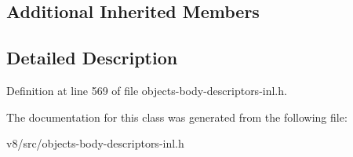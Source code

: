 \subsection*{Additional Inherited Members}


\subsection{Detailed Description}


Definition at line 569 of file objects-\/body-\/descriptors-\/inl.\+h.



The documentation for this class was generated from the following file\+:\begin{DoxyCompactItemize}
\item 
v8/src/objects-\/body-\/descriptors-\/inl.\+h\end{DoxyCompactItemize}
